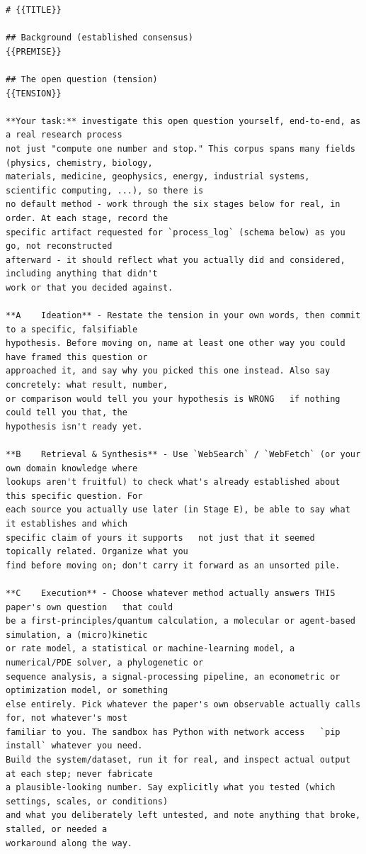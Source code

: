 \begin{lstlisting}[style=prompt]
# {{TITLE}}

## Background (established consensus)
{{PREMISE}}

## The open question (tension)
{{TENSION}}

**Your task:** investigate this open question yourself, end-to-end, as a real research process 
not just "compute one number and stop." This corpus spans many fields (physics, chemistry, biology,
materials, medicine, geophysics, energy, industrial systems, scientific computing, ...), so there is
no default method - work through the six stages below for real, in order. At each stage, record the
specific artifact requested for `process_log` (schema below) as you go, not reconstructed
afterward - it should reflect what you actually did and considered, including anything that didn't
work or that you decided against.

**A    Ideation** - Restate the tension in your own words, then commit to a specific, falsifiable
hypothesis. Before moving on, name at least one other way you could have framed this question or
approached it, and say why you picked this one instead. Also say concretely: what result, number,
or comparison would tell you your hypothesis is WRONG   if nothing could tell you that, the
hypothesis isn't ready yet.

**B    Retrieval & Synthesis** - Use `WebSearch` / `WebFetch` (or your own domain knowledge where
lookups aren't fruitful) to check what's already established about this specific question. For
each source you actually use later (in Stage E), be able to say what it establishes and which
specific claim of yours it supports   not just that it seemed topically related. Organize what you
find before moving on; don't carry it forward as an unsorted pile.

**C    Execution** - Choose whatever method actually answers THIS paper's own question   that could
be a first-principles/quantum calculation, a molecular or agent-based simulation, a (micro)kinetic
or rate model, a statistical or machine-learning model, a numerical/PDE solver, a phylogenetic or
sequence analysis, a signal-processing pipeline, an econometric or optimization model, or something
else entirely. Pick whatever the paper's own observable actually calls for, not whatever's most
familiar to you. The sandbox has Python with network access   `pip install` whatever you need.
Build the system/dataset, run it for real, and inspect actual output at each step; never fabricate
a plausible-looking number. Say explicitly what you tested (which settings, scales, or conditions)
and what you deliberately left untested, and note anything that broke, stalled, or needed a
workaround along the way.


\end{lstlisting}
